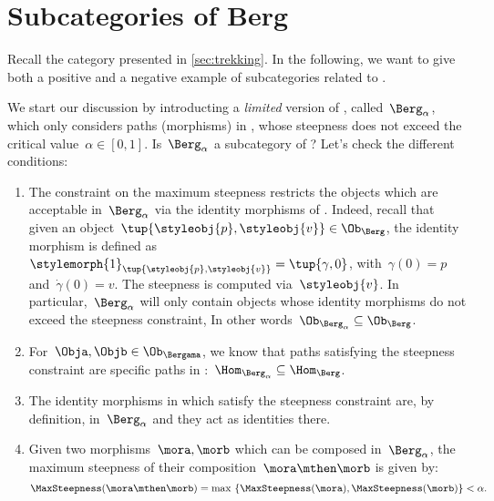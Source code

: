 
\section{Subcategories of Berg}
\label{sec:subcat_berg}

Recall the category \Berg presented in \cref{sec:trekking}.
In the following, we want to give both a positive and a negative example of subcategories related to \Berg.

We start our discussion by introducting a \emph{limited} version of \Berg, called~$\Berg_\alpha$, which only considers paths (morphisms) in \Berg, whose steepness does not exceed the critical value~$\alpha\in [0,1]$.
Is~$\Berg_\alpha$ a subcategory of \Berg?
Let's check the different conditions:
\begin{enumerate}
    \item The constraint on the maximum steepness restricts the objects which are acceptable in~$\Berg_\alpha$ via the identity morphisms of \Berg.
          Indeed, recall that given an object~$\tup{\styleobj{p},\styleobj{v}}\in \Ob_{\Berg}$, the identity morphism is defined as~$\stylemorph{1}_{\tup{\styleobj{p},\styleobj{v}}}=\tup{\gamma,0}$, with~$\gamma(0)=p$ and~$\dot{\gamma}(0)=v$.
          The steepness is computed via~$\styleobj{v}$.
          In particular,~$\Berg_\alpha$ will only contain objects whose identity morphisms do not exceed the steepness constraint, In other words~$\Ob_{\Berg_\alpha} \subseteq \Ob_\Berg$.
    \item For~$\Obja,\Objb\in \Ob_{\Bergama}$, we know that paths satisfying the steepness constraint are specific paths in \Berg:~$\Hom_{\Berg_\alpha}\subseteq \Hom_{\Berg}$.
    \item The identity morphisms in \Berg which satisfy the steepness constraint are, by definition, in~$\Berg_\alpha$ and they act as identities there.
    \item Given two morphisms~$\mora,\morb$ which can be composed in~$\Berg_\alpha$, the maximum steepness of their composition~$\mora \mthen \morb$ is given by:
          \begin{equation*}
              \MaxSteepness(\mora \mthen \morb)
              =
              \max \ \{
              \MaxSteepness(\mora),
              \MaxSteepness(\morb)
              \}
              <
              \alpha.
          \end{equation*}
\end{enumerate}

